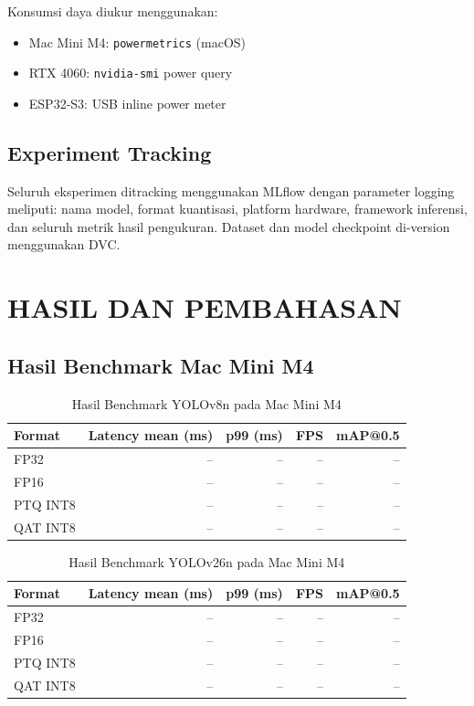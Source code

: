 \documentclass[12pt, a4paper]{report}
\begin{document}
Konsumsi daya diukur menggunakan:
\begin{itemize}
  \item Mac Mini M4: \texttt{powermetrics} (macOS)
  \item RTX 4060: \texttt{nvidia-smi} power query
  \item ESP32-S3: USB inline power meter
\end{itemize}

\section{Experiment Tracking}

Seluruh eksperimen ditracking menggunakan MLflow dengan parameter logging
meliputi: nama model, format kuantisasi, platform hardware, framework inferensi,
dan seluruh metrik hasil pengukuran. Dataset dan model checkpoint
di-version menggunakan DVC.

\chapter{HASIL DAN PEMBAHASAN}

\section{Hasil Benchmark Mac Mini M4}


\begin{table}[H]
  \centering
  \caption{Hasil Benchmark YOLOv8n pada Mac Mini M4}
  \label{tab:m4_yolov8n}
  \begin{tabular}{lrrrr}
    \toprule
    \textbf{Format} & \textbf{Latency mean (ms)} &
    \textbf{p99 (ms)} & \textbf{FPS} & \textbf{mAP@0.5} \\
    \midrule
    FP32     & -- & -- & -- & -- \\
    FP16     & -- & -- & -- & -- \\
    PTQ INT8 & -- & -- & -- & -- \\
    QAT INT8 & -- & -- & -- & -- \\
    \bottomrule
  \end{tabular}
\end{table}

\begin{table}[H]
  \centering
  \caption{Hasil Benchmark YOLOv26n pada Mac Mini M4}
  \label{tab:m4_yolov26n}
  \begin{tabular}{lrrrr}
    \toprule
    \textbf{Format} & \textbf{Latency mean (ms)} &
    \textbf{p99 (ms)} & \textbf{FPS} & \textbf{mAP@0.5} \\
    \midrule
    FP32     & -- & -- & -- & -- \\
    FP16     & -- & -- & -- & -- \\
    PTQ INT8 & -- & -- & -- & -- \\
    QAT INT8 & -- & -- & -- & -- \\
    \bottomrule
  \end{tabular}
\end{table}
\end{document}
